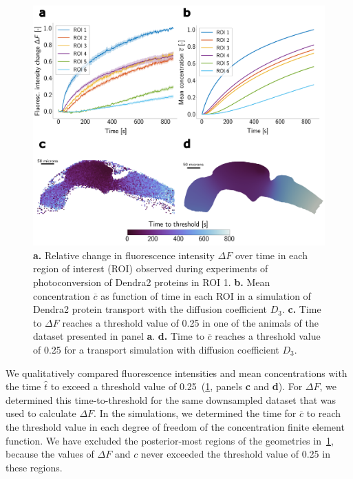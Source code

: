 \documentclass[fleqn]{wlscirep}
\begin{document}
\begin{figure}[H]
    \centering
    \includegraphics[width=\textwidth]{graphics/figure3_compare_experiments_and_simulations.png}
    \caption{\textbf{a.} Relative change in fluorescence intensity $\Delta F$ over time in each region of interest (ROI) observed during experiments of photoconversion of Dendra2 proteins in ROI 1. \textbf{b.} Mean concentration $\overline{c}$ as function of time in each ROI in a simulation of Dendra2 protein transport with the diffusion coefficient $D_3$. \textbf{c.} Time to $\Delta F$ reaches a threshold value of 0.25 in one of the animals of the dataset presented in panel \textbf{a}. \textbf{d.} Time to $\overline{c}$ reaches a threshold value of 0.25 for a transport simulation with diffusion coefficient $D_3$.}
    \label{fig:figure3_compare_exp_and_sim_control}
\end{figure}

We qualitatively compared fluorescence intensities and mean concentrations with the time $\hat{t}$ to exceed a threshold value of 0.25~(\cref{fig:figure3_compare_exp_and_sim_control}, panels \textbf{c} and \textbf{d}). For $\Delta F$, we determined this time-to-threshold for the same downsampled dataset that was used to calculate $\Delta F$. In the simulations, we determined the time for $\overline{c}$ to reach the threshold value in each degree of freedom of the concentration finite element function. We have excluded the posterior-most regions of the geometries in~\cref{fig:figure3_compare_exp_and_sim_control}, because the values of $\Delta F$ and $c$ never exceeded the threshold value of 0.25 in these regions. 
\end{document}
